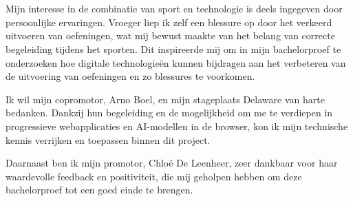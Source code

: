 
\chapter*{}%
\label{ch:voorwoord}


Mijn interesse in de combinatie van sport en technologie is deels ingegeven door persoonlijke ervaringen. 
Vroeger liep ik zelf een blessure op door het verkeerd uitvoeren van oefeningen, wat mij bewust maakte van het belang van correcte begeleiding tijdens het sporten. 
Dit inspireerde mij om in mijn bachelorproef te onderzoeken hoe digitale technologieën kunnen bijdragen aan het verbeteren van de uitvoering van oefeningen en zo blessures te voorkomen.

\medskip

Ik wil mijn copromotor, Arno Boel, en mijn stageplaats Delaware van harte bedanken. 
Dankzij hun begeleiding en de mogelijkheid om me te verdiepen in progressieve webapplicaties en AI-modellen in de browser, kon ik mijn technische kennis verrijken en toepassen binnen dit project.

\medskip

Daarnaast ben ik mijn promotor, Chloé De Leenheer, zeer dankbaar voor haar waardevolle feedback en positiviteit, die mij geholpen hebben om deze bachelorproef tot een goed einde te brengen.

